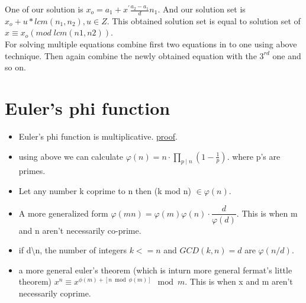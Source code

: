 \documentclass[../Notes.tex]{subfiles}
\begin{document}
One of our solution is $x_o=a_1+x^\prime \frac{a_2-a_1}{d}n_1$. And our solution set is \\ $x_o+u*lcm(n_1,n_2), u\in Z$. This obtained solution set is equal to solution set of $x\equiv x_o(mod\;lcm(n1,n2))$.\\

For solving multiple equations combine first two equations in to one using above technique. Then again combine the newly obtained equation with the $3^{rd}$ one and so on.

\section{Euler's phi function}
\begin{itemize}
	\item Euler's phi function is multiplicative. \href{https://proofwiki.org/w/index.php?title=Euler_Phi_Function_is_Multiplicative&oldid=373969}{proof}.
	\item using above we can calculate $\varphi(n) = n\cdot \prod_{p\mid n}\left(1 - \frac1p\right).$ where p's are primes.
	\item Let any number k coprime to n then (k mod n) $\in \varphi(n)$.
	\item A more generalized form $\varphi (mn) = \varphi (m) \varphi (n) \cdot \dfrac{d}{\varphi (d)}$. This is when m and n aren't necessarily co-prime.
	\item if d\textbackslash n, the number of integers $k<=n$ and $GCD(k,n)=d$ are $\varphi(n/d)$.
	\item a more general euler's theorem (which is inturn more general fermat's little theorem) $x^{n}\equiv x^{\phi(m)+[n \bmod \phi(m)]} \mod m$. This is when x and m aren't necessarily coprime.
\end{itemize}
\end{document}
